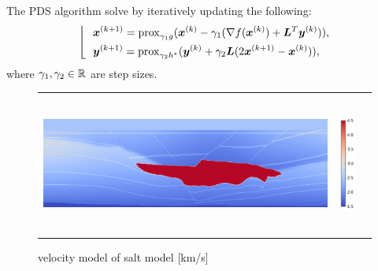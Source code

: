 The PDS algorithm solve by iteratively updating the following:
\begin{equation} \label{eq:PDSSubStep} \left \lfloor \ \ \begin{aligned} & \bm{x}^{(k+1)} = \mathrm{prox}_{\gamma_1 g}(\bm{x}^{(k)} - \gamma_1( \nabla f(\bm{x}^{(k)}) + \bm{L}^T \bm{y}^{(k)} )), \\ & \bm{y}^{(k+1)} = \mathrm{prox}_{\gamma_2 h^*}(\bm{y}^{(k)} + \gamma_2 \bm{L} (2\bm{x}^{(k+1)} - \bm{x}^{(k)}) ), \\ \end{aligned} \right. \end{equation}
where $\gamma_1, \gamma_2 \in \mathbb{R}$ are step sizes.


\begin{figure}[htbp]
    \centering
    \begin{tabular}{m{138mm} m{10mm} m{0mm}}
        \begin{minipage}[b]{140mm}
            \centering
            \includegraphics[width=140mm]{public/full_true_vm}
        \end{minipage} &
        \begin{minipage}[b]{20mm}
            \centering
            \includegraphics[height=46mm]{public/color-bar}
        \end{minipage} &
    \end{tabular}
    \caption{velocity model of salt model [km/s]}
    \label{fig:salt-model}
\end{figure}



